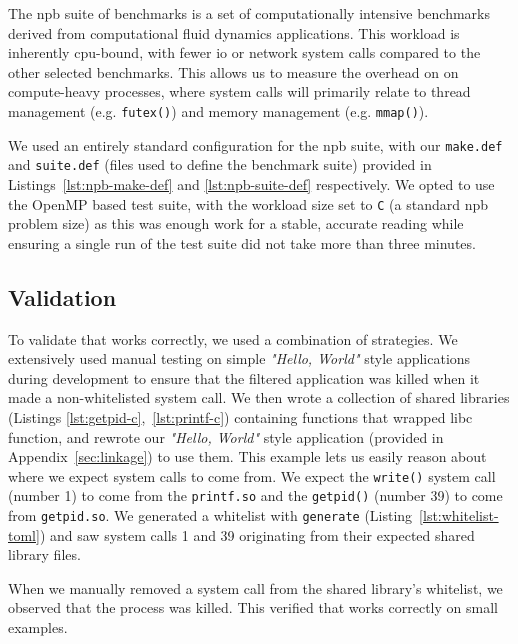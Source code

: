 The \acl{npb} suite of benchmarks is a set of computationally intensive 
benchmarks derived from computational fluid dynamics applications. This 
workload is inherently \ac{cpu}-bound, with fewer \ac{io} or network system calls
compared to the other selected benchmarks. This allows us to measure the
overhead on \af on compute-heavy processes, where system calls will primarily relate
to thread management (e.g. \texttt{futex()}) and memory management (e.g. 
\texttt{mmap()}).

We used an entirely standard configuration for the \ac{npb} suite, with our
\texttt{make.def} and \texttt{suite.def} (files used to define the benchmark
suite) provided in Listings~\ref{lst:npb-make-def} and \ref{lst:npb-suite-def}
respectively. We opted to use the OpenMP based test suite, with the workload 
size set to \texttt{C} (a standard \ac{npb} problem size) as this was enough 
work for a stable, accurate reading while ensuring a single run of the test 
suite did not take more than three minutes.


\subsection{Validation}

To validate that \af works correctly, we used a combination of strategies. We 
extensively used manual testing on simple \textit{"Hello, World"} style 
applications during development to ensure that the filtered application was 
killed when it made a non-whitelisted system call. We then wrote a collection of 
shared libraries (Listings \ref{lst:getpid-c},~\ref{lst:printf-c}) containing 
functions that wrapped \ac{libc} function, and rewrote our 
\textit{"Hello, World"} style application (provided in Appendix~\ref{sec:linkage})
to use them. This example lets us easily reason about where we expect system calls
to come from. We expect the \texttt{write()} system call (number 1) to come from 
the \texttt{printf.so} and the \texttt{getpid()} (number 39) to come from 
\texttt{getpid.so}. We generated a whitelist with \af \texttt{generate} 
(Listing~\ref{lst:whitelist-toml}) and saw system calls 1 and 39 originating from
their expected shared library files.

When we manually removed a system call from the shared library's whitelist, we 
observed that the process was killed. This  verified that \af works correctly
on small examples.

